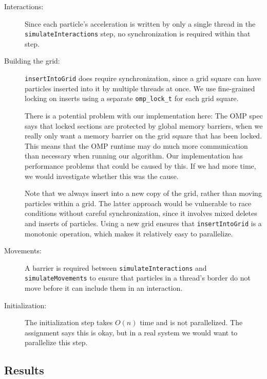 \documentclass{article}
\newcommand{\code}[1]%
  {\texttt{#1}}
\begin{document}
\begin{description}
  \item[Interactions:] Since each particle's acceleration is written by only a single thread in the \code{simulateInteractions} step, no synchronization is required within that step.
  \item[Building the grid:] \code{insertIntoGrid} does require synchronization, since a grid square can have particles inserted into it by multiple threads at once.  We use fine-grained locking on inserts using a separate \code{omp\_lock\_t} for each grid square.
  
  There is a potential problem with our implementation here: The OMP spec says that locked sections are protected by global memory barriers, when we really only want a memory barrier on the grid square that has been locked.  This means that the OMP runtime may do much more communication than necessary when running our algorithm.  Our implementation has performance problems that could be caused by this.  If we had more time, we would investigate whether this was the cause.
  
  Note that we always insert into a new copy of the grid, rather than moving particles within a grid.  The latter approach would be vulnerable to race conditions without careful synchronization, since it involves mixed deletes and inserts of particles.  Using a new grid ensures that \code{insertIntoGrid} is a monotonic operation, which makes it relatively easy to parallelize.  
  \item[Movements:] A barrier is required between \code{simulateInteractions} and \code{simulateMovements} to ensure that particles in a thread's border do not move before it can include them in an interaction.
  \item[Initialization:] The initialization step takes $O(n)$ time and is not parallelized.  The assignment says this is okay, but in a real system we would want to parallelize this step.
\end{description}

\subsection{Results}
\end{document}
